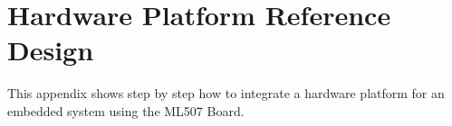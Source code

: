 \chapter{Hardware Platform Reference Design}

This appendix shows step by step how to integrate a hardware platform for an embedded system using the ML507 Board.

